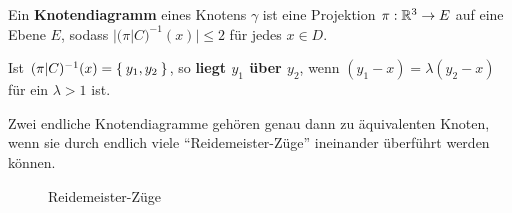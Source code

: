 \begin{definition}%
    Ein \textbf{Knotendiagramm} eines Knotens $\gamma$ ist eine 
    Projektion $\pi: \mathbb{R}^3 \rightarrow E$ auf eine Ebene $E$, sodass
    $|(\pi|C)^{-1}(x)| \leq 2$ für jedes $x \in D$.

    Ist $(\pi|C)^{-1}(x) = \Set{y_1, y_2}$, so \textbf{liegt $y_1$ über $y_2$},
    wenn $(y_1-x) = \lambda (y_2 - x)$ für ein $\lambda > 1$ ist.
\end{definition}

\begin{satz}
    Zwei endliche Knotendiagramme gehören genau dann zu äquivalenten
    Knoten, wenn sie durch endlich viele \enquote{Reidemeister-Züge}
    ineinander überführt werden können.
\end{satz}

\begin{figure}[htp]
    \centering
    \qquad\qquad%


    \caption{Reidemeister-Züge}
    \label{fig:reidemeister-zuege}
\end{figure}

